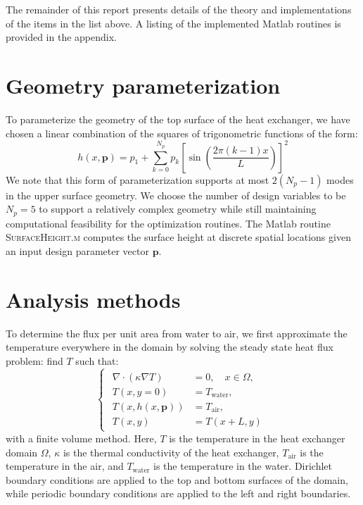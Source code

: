 \documentclass[11pt]{article}
\begin{document}
The remainder of this report presents details of the theory and
implementations of the items in the list above. A listing of the
implemented Matlab routines is provided in the appendix.

\section{Geometry parameterization}

To parameterize the geometry of the top surface of the heat exchanger,
we have chosen a linear combination of the squares of trigonometric functions
of the form:
\begin{equation}
h(x, \boldsymbol{p}) = p_1 + \sum_{k=0}^{N_p} p_k
\left[ \sin \left( \frac{2 \pi (k-1) x} {L} \right) \right]^2
\end{equation}
We note that this form of parameterization supports
at most $2(N_p - 1)$ modes in the upper surface geometry. We choose
the number of design variables to be $N_p = 5$ to support a
relatively complex geometry while still maintaining computational
feasibility for the optimization routines. The Matlab routine
\textsc{SurfaceHeight.m} computes the surface height at discrete
spatial locations given an input design parameter vector
$\boldsymbol{p}$.

\section{Analysis methods}

To determine the flux per unit area from water to air, we first
approximate the temperature everywhere in the domain by solving the steady
state heat flux problem: find $T$ such that:
\begin{equation}
\begin{cases}
\begin{aligned}
\nabla \cdot ( \kappa \nabla T) &= 0, \quad x \in \Omega, \\
T(x,y=0) &= T_{\text{water}}, \\
T(x,h(x,\boldsymbol{p})) &= T_{\text{air}}, \\
T(x,y) &= T(x + L, y)
\end{aligned}
\end{cases}
\end{equation}
with a finite volume method. Here, $T$ is the temperature in the heat
exchanger domain $\Omega$, $\kappa$ is the thermal conductivity of the
heat exchanger, $T_{\text{air}}$ is the temperature in the air, and
$T_{\text{water}}$ is the temperature in the water. Dirichlet boundary
conditions are applied to the top and bottom surfaces of the domain,
while periodic boundary conditions are applied to the left and right
boundaries.
\end{document}
